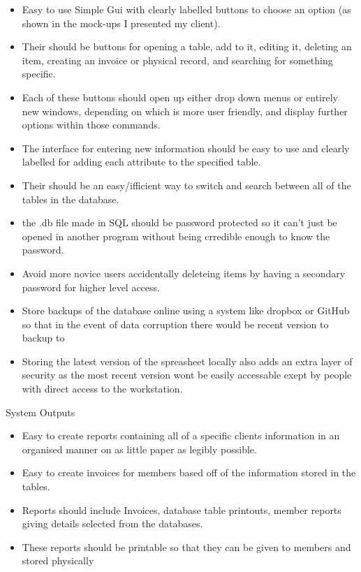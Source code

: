 \begin{itemize}  

        \item Easy to use Simple Gui with clearly labelled buttons to choose an option (as shown in the mock-ups I presented my client).
        \item Their should be buttons for opening a table, add to it, editing it, deleting an item, creating an invoice or physical record, and searching for something specific.
        \item Each of these buttons should open up either drop down menus or entirely new windows, depending on which is more user friendly, and display further options within those commands.
        \item The interface for entering new information should be easy to use and clearly labelled for adding each attribute to the specified table.
        \item Their should be an easy/ifficient way to switch and search between all of the tables in the database.
        \item the .db file made in SQL should be password protected so it can't just be opened in another program without being crredible enough to know the password.
        \item Avoid more novice users accidentally deleteing items by having a secondary password for higher level access.
        \item Store backups of the database online using a system like dropbox or GitHub so that in the event of data corruption there would be recent version to backup to
        \item Storing the latest version of the spreasheet locally also adds an extra layer of security as the most recent version wont be easily accessable exept by people with direct access to the workstation.
    \end{itemize}


System Outputs

\begin{itemize}  

        \item Easy to create reports containing all of a specific clients information in an organised manner on as little paper as legibly possible.
        \item Easy to create invoices for members based off of the information stored in the tables.
        \item Reports should include Invoices, database table printouts, member reports giving details selected from the databases.
        \item These reports should be printable so that they can be given to members and stored physically
        
\end{itemize}

